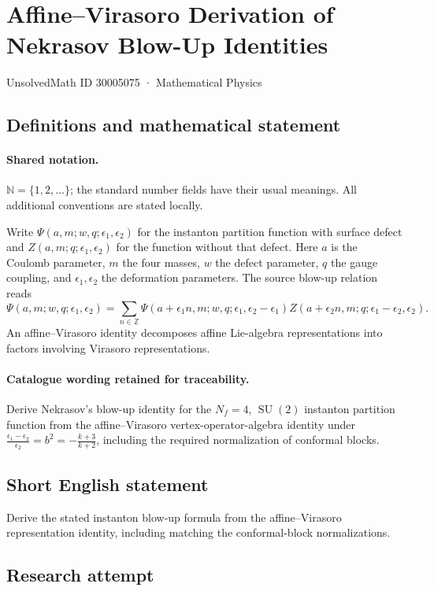 \documentclass[11pt]{article}
\begin{document}
\setcounter{section}{30005074}
\section{Affine–Virasoro Derivation of Nekrasov Blow-Up Identities}\label{30005075}
{\small UnsolvedMath ID 30005075 · Mathematical Physics}
\subsection{Definitions and mathematical statement}

\paragraph{Shared notation.}$\mathbb N=\{1,2,\ldots\}$; the standard number fields have their usual meanings. All additional conventions are stated locally.


Write $\Psi(a,m;w,q;\epsilon_1,\epsilon_2)$ for the instanton partition function with surface defect and $Z(a,m;q;\epsilon_1,\epsilon_2)$ for the function without that defect. Here $a$ is the Coulomb parameter, $m$ the four masses, $w$ the defect parameter, $q$ the gauge coupling, and $\epsilon_1,\epsilon_2$ the deformation parameters. The source blow-up relation reads
\[
\Psi(a,m;w,q;\epsilon_1,\epsilon_2)=\sum_{n\in\mathbb Z}
\Psi(a+\epsilon_1n,m;w,q;\epsilon_1,\epsilon_2-\epsilon_1)
Z(a+\epsilon_2n,m;q;\epsilon_1-\epsilon_2,\epsilon_2).
\]
An affine--Virasoro identity decomposes affine Lie-algebra representations into factors involving Virasoro representations.

\paragraph{Catalogue wording retained for traceability.}
Derive Nekrasov's blow-up identity for the $N_f=4$, $\operatorname{SU}(2)$ instanton partition function from the affine–Virasoro vertex-operator-algebra identity under $\frac{\epsilon_1-\epsilon_2}{\epsilon_2}=b^2=-\frac{k+3}{k+2}$, including the required normalization of conformal blocks.
\subsection{Short English statement}
Derive the stated instanton blow-up formula from the affine--Virasoro representation identity, including matching the conformal-block normalizations.
\subsection{Research attempt}
\end{document}
